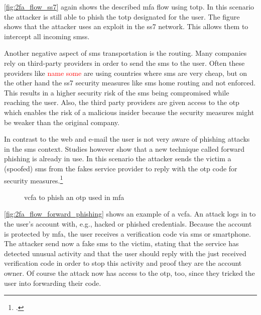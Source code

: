 \autoref{fig:2fa_flow_ss7} again shows the described \gls{mfa} flow using \gls{totp}. In this scenario the attacker is still able to phish the \gls{totp} designated for the user. The figure shows that the attacker uses an exploit in the \gls{ss7} network. This allows them to intercept all incoming \glspl{sms}.

\newpage

Another negative aspect of \gls{sms} transportation is the routing. Many companies rely on third-party providers in order to send the \gls{sms} to the user. Often these providers like \textcolor{red}{name some} are using countries where \gls{sms} are very cheap, but on the other hand the \gls{ss7} security measures like \gls{sms} home routing and not enforced. This results in a higher security risk of the \gls{sms} being compromised while reaching the user. Also, the third party providers are given access to the \gls{otp} which enables the risk of a malicious insider because the security measures might be weaker than the original company.

In contrast to the web and e-mail the user is not very aware of phishing attacks in the \gls{sms} context. Studies however show that a new technique called forward phishing is already in use. In this scenario the attacker sends the victim a (spoofed) \gls{sms} from the fakes service provider to reply with the \gls{otp} code for security measures.\footcite{JAKOBSSON20186,SIADATI201714}

\begin{figure}[hbt]
	\centering
	
	\caption[\gls{vcfa} to phish an \gls{otp} used in \gls{mfa}]{\gls{vcfa} to phish an \gls{otp} used in \gls{mfa}\footnotemark}
	\label{fig:2fa_flow_forward_phishing}
\end{figure}

\autoref{fig:2fa_flow_forward_phishing} shows an example of a \gls{vcfa}. An attack logs in to the user's account with, e.g., hacked or phished credentials. Because the account is protected by \gls{mfa}, the user receives a verification code via \gls{sms} or smartphone. The attacker send now a fake \gls{sms} to the victim, stating that the service has detected unusual activity and that the user should reply with the just received verification code in order to stop this activity and proof they are the account owner. Of course the attack now has access to the \gls{otp}, too, since they tricked the user into forwarding their code.

